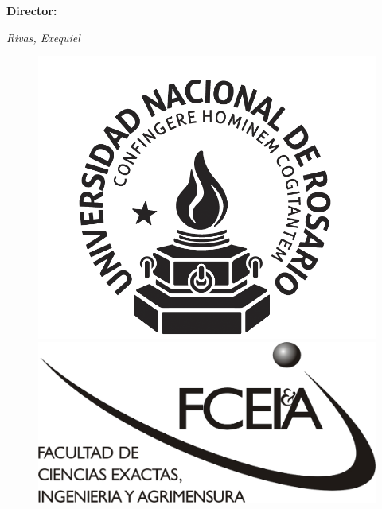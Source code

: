 \begin{titlepage}
	\vspace{2\baselineskip} %

        \Large{\textbf{Director:}}
	
	
    {\itshape\LARGE Rivas, Exequiel}

	\vspace*{6\baselineskip} %
    
    \begin{figure}[h] %
	\centering
	\includegraphics[width=0.3\linewidth]{img/UNR.png} \hfill \includegraphics[width=0.3\linewidth]{img/FCEIA.jpeg}
	\end{figure}
    
    \vfill %
	
		
	\vspace{0.2\baselineskip} %
	
	

\end{titlepage}

